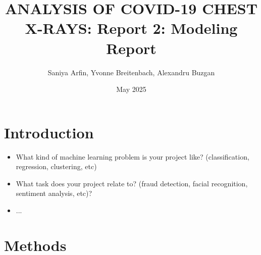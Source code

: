 \documentclass{article}
\title{ANALYSIS OF COVID-19 CHEST X-RAYS: Report 2: Modeling Report}
\author{Saniya Arfin, Yvonne Breitenbach, Alexandru Buzgan}
\date{May 2025}
\begin{document}
\maketitle

\tableofcontents

\newpage 

\section{Introduction}
\begin{itemize}
    \item What kind of machine learning problem is your project like? (classification, regression, clustering, etc)
    \item What task does your project relate to? (fraud detection, facial recognition, sentiment analysis, etc)?
    \item ...
\end{itemize}

\section{Methods}
\end{document}
